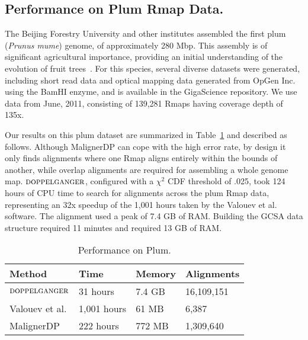 \subsection{Performance on Plum Rmap Data.} \label{section:plum}

The Beijing Forestry University
and other institutes assembled the first plum ({\em Prunus mume}) genome, of approximately 280 Mbp.  
This assembly is of significant agricultural importance, providing an initial understanding of the evolution of fruit trees~\cite{plum}.  For this species, several diverse datasets were generated, including short read data 
and optical mapping data generated from OpGen Inc. using the BamHI enzyme, 
and is available in the GigaScience repository.
We use data from June, 2011, consisting of 139,281 Rmaps having coverage depth of 135x.

Our results on this plum dataset are summarized in Table~\ref{tbl-plum} and described as follows.  Although MalignerDP can cope with the high error rate, by design it only finds alignments where one Rmap aligns entirely within the bounds of another, while overlap alignments are required for assembling a whole genome map. $\mbox{\rm {\sc doppelganger}}$, configured with a $\chi^2$ CDF threshold of .025, took 124 hours of CPU time to search for alignments across the plum Rmap data, representing an 32x speedup of the 1,001 hours taken by the Valouev et al. software.  The alignment used a peak of 7.4 GB of RAM.  Building the GCSA data structure required 11  minutes and required 13 GB of RAM.

\begin{table}[h!]
  \small
  \centering
  \begin{tabular}{l|l|l|l}
	{\bf Method}	& {\bf Time}		& {\bf Memory} 	& {\bf Alignments } \\
	\hline
	\hline

   	 $\mbox{\rm {\sc doppelganger}}$    	 	& 31 hours		& 7.4 GB  & 16,109,151 \\
	Valouev et al. 		& 1,001 hours 	& 61 MB		&  6,387  \\
    MalignerDP          & 222 hours     & 772 MB    & 1,309,640 \\
	\end{tabular}
      \caption{Performance on Plum.}
 \label{tbl-plum}
\end{table}

